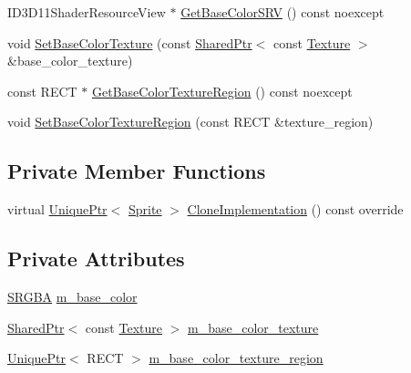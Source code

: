 \begin{DoxyCompactItemize}
\item 
I\+D3\+D11\+Shader\+Resource\+View $\ast$ \hyperlink{classmage_1_1_sprite_image_a955225e8274ae5f39f6eb6f6fbb75638}{Get\+Base\+Color\+S\+RV} () const noexcept
\item 
void \hyperlink{classmage_1_1_sprite_image_a468fb3e862e4dd0ba46f49c4cffc8659}{Set\+Base\+Color\+Texture} (const \hyperlink{namespacemage_a1e01ae66713838a7a67d30e44c67703e}{Shared\+Ptr}$<$ const \hyperlink{classmage_1_1_texture}{Texture} $>$ \&base\+\_\+color\+\_\+texture)
\item 
const R\+E\+CT $\ast$ \hyperlink{classmage_1_1_sprite_image_afd401746e4466bf7849acb373675527c}{Get\+Base\+Color\+Texture\+Region} () const noexcept
\item 
void \hyperlink{classmage_1_1_sprite_image_a5e98bd9b7fc39384625400187a90f82e}{Set\+Base\+Color\+Texture\+Region} (const R\+E\+CT \&texture\+\_\+region)
\end{DoxyCompactItemize}
\subsection*{Private Member Functions}
\begin{DoxyCompactItemize}
\item 
virtual \hyperlink{namespacemage_a3316d7143a973e37adf1110f2e80ca31}{Unique\+Ptr}$<$ \hyperlink{classmage_1_1_sprite}{Sprite} $>$ \hyperlink{classmage_1_1_sprite_image_ad6460971fc4ffb425b7a43d27c9b05b2}{Clone\+Implementation} () const override
\end{DoxyCompactItemize}
\subsection*{Private Attributes}
\begin{DoxyCompactItemize}
\item 
\hyperlink{structmage_1_1_s_r_g_b_a}{S\+R\+G\+BA} \hyperlink{classmage_1_1_sprite_image_aa83cc38aa8a84e8fc434232b4223c236}{m\+\_\+base\+\_\+color}
\item 
\hyperlink{namespacemage_a1e01ae66713838a7a67d30e44c67703e}{Shared\+Ptr}$<$ const \hyperlink{classmage_1_1_texture}{Texture} $>$ \hyperlink{classmage_1_1_sprite_image_a92f5b052561ca7d8fb317b8479d820a2}{m\+\_\+base\+\_\+color\+\_\+texture}
\item 
\hyperlink{namespacemage_a3316d7143a973e37adf1110f2e80ca31}{Unique\+Ptr}$<$ R\+E\+CT $>$ \hyperlink{classmage_1_1_sprite_image_ab921e099c41323969c86f7bac9c81f4f}{m\+\_\+base\+\_\+color\+\_\+texture\+\_\+region}
\end{DoxyCompactItemize}
